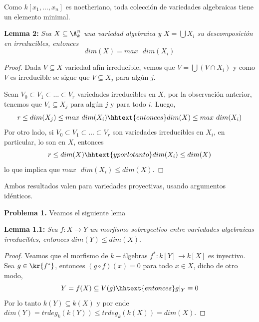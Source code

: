 \documentclass{article}
\begin{document}
Como $k[x_{1},\dots,x_{n}]$ es noetheriano, toda colección de variedades algebraicas tiene un 
elemento minimal.

\vspace{2mm}
\noindent\textbf{Lemma 2:} \emph{Sea $X\subseteq\A_{k}^{n}$ una variedad algebraica y 
$X=\bigcup X_{i}$ su descomposición en irreducibles, entonces}
\begin{equation*}
    dim(X)=max \text{ } dim(X_{i})
\end{equation*}

\begin{proof}
    Dada $V\subseteq X$ variedad afín irreducible, vemos que $V=\bigcup(V\cap X_{i})$ y como $V$ 
    es irreducible se sigue que $V\subseteq X_{j}$ para algún $j$.

    \vspace{2mm}
    Sean $V_{0}\subset V_{1}\subset\dots\subset V_{r}$ variedades irreducibles en $X$, por la 
    observación anterior, tenemos que $V_{i}\subseteq X_{j}$ para algún $j$ y para todo $i$. 
    Luego,
    \begin{equation*}
        r\leq dim(X_{j})\leq max \text{ } dim(X_{i})
        \hhtext{entonces}
        dim(X)\leq max \text{ } dim(X_{i})
    \end{equation*}
    Por otro lado, si $V_{0}\subset V_{1}\subset\dots\subset V_{r}$ son variedades irreducibles en
    $X_{i}$, en particular, lo son en $X$, entonces
    \begin{equation*}
        r\leq dim(X)
        \hhtext{y por lo tanto}
        dim(X_{i})\leq dim(X)
    \end{equation*}
    lo que implica que $max \text{ } dim(X_{i})\leq dim(X)$.
\end{proof}

Ambos resultados valen para variedades proyectivas, usando argumentos idénticos.

\vspace{3mm}
\noindent\textbf{Problema 1.} Veamos el siguiente lema

\vspace{2mm}
\noindent\textbf{Lemma 1.1:} \emph{Sea $f:X\to Y$ un morfismo sobreyectivo entre variedades 
algebraicas irreducibles, entonces $dim(Y)\leq dim(X)$}.

\begin{proof}
    Veamos que el morfismo de $k-$álgebras $f^{*}:k[Y]\to k[X]$ es inyectivo. Sea 
    $g\in\kr{f^{*}}$, entonces $(g\circ f)(x)=0$ para todo $x\in X$, dicho de otro modo,
    \begin{equation*}
        Y=f(X)\subseteq V(g) \hhtext{entonces} g|_{Y}\equiv0
    \end{equation*}
    Por lo tanto $k(Y)\subseteq k(X)$ y por ende 
    $dim(Y)=trdeg_{k}(k(Y))\leq trdeg_{k}(k(X))=dim(X)$.
\end{proof}
\end{document}
